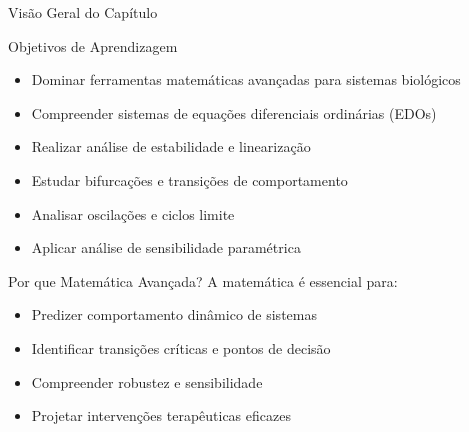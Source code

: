 \begin{frame}[allowframebreaks]{Visão Geral do Capítulo}
\begin{block}{Objetivos de Aprendizagem}
\begin{itemize}
    \item Dominar ferramentas matemáticas avançadas para sistemas biológicos
    \item Compreender sistemas de equações diferenciais ordinárias (EDOs)
    \item Realizar análise de estabilidade e linearização
    \item Estudar bifurcações e transições de comportamento
    \item Analisar oscilações e ciclos limite
    \item Aplicar análise de sensibilidade paramétrica
\end{itemize}
\end{block}

\vspace{0.5cm}

\begin{exampleblock}{Por que Matemática Avançada?}
A matemática é essencial para:
\begin{itemize}
    \item Predizer comportamento dinâmico de sistemas
    \item Identificar transições críticas e pontos de decisão
    \item Compreender robustez e sensibilidade
    \item Projetar intervenções terapêuticas eficazes
\end{itemize}
\end{exampleblock}
\end{frame}

